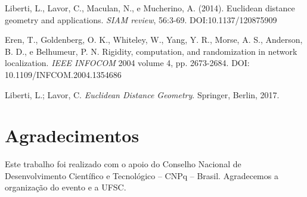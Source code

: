 \documentclass[a0,portrait]{a0poster}
\theoremstyle{plain}
\theoremstyle{definition}
\begin{document}
\begin{multicols}{2}
\begin{thebibliography}{00}
	 Liberti, L., Lavor, C., Maculan, N., e Mucherino, A. (2014). Euclidean distance geometry and applications. \textit{SIAM review}, 56:3-69. DOI:10.1137/120875909
	
	 Eren, T., Goldenberg, O. K., Whiteley, W., Yang, Y. R., Morse, A. S., Anderson, B. D., e Belhumeur, P. N. Rigidity, computation, and randomization in network localization. \textit{IEEE INFOCOM} 2004 volume 4, pp. 2673-2684. DOI: 10.1109/INFCOM.2004.1354686
	
	
	
	 Liberti, L.; Lavor, C. \textit{Euclidean Distance Geometry}. Springer, Berlin, 2017.
	
	
	
\end{thebibliography}

\vspace{-1cm}
\section*{Agradecimentos}\vspace{-0.7cm}
Este trabalho foi realizado com o apoio do Conselho Nacional de Desenvolvimento	Científico e Tecnológico -- CNPq -- Brasil. Agradecemos a organização do evento e a UFSC.




\end{multicols}
\end{document}

